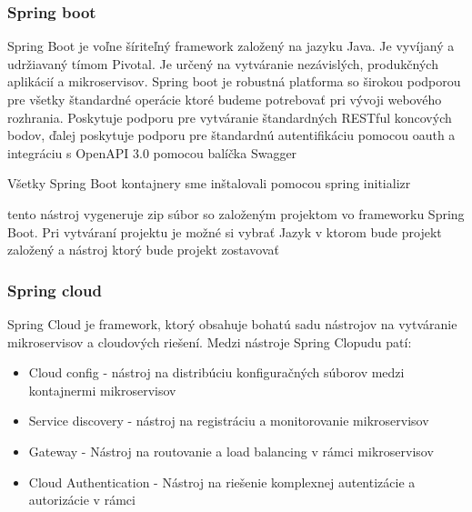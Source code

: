 \subsubsection{Spring boot}  
Spring Boot je voľne šíriteľný framework založený na jazyku Java. Je vyvíjaný a udržiavaný tímom Pivotal. Je určený na vytváranie nezávislých, produkčných aplikácií a mikroservisov. Spring boot je robustná platforma so širokou podporou pre všetky štandardné operácie ktoré budeme potrebovať pri vývoji webového rozhrania. Poskytuje podporu pre vytváranie štandardných RESTful koncových bodov, ďalej poskytuje podporu pre štandardnú autentifikáciu pomocou \acrshort{oauth} a integráciu s  OpenAPI 3.0 \cite{openapi3} pomocou balíčka Swagger \cite{swagger} 







Všetky Spring Boot kontajnery sme inštalovali pomocou spring initializr \cite{initializr} 

tento nástroj vygeneruje zip súbor so založeným projektom vo frameworku Spring Boot. Pri vytváraní projektu je možné si vybrať Jazyk v ktorom bude projekt založený a nástroj ktorý bude projekt zostavovať %

\subsubsection{Spring cloud}  

Spring Cloud je framework, ktorý obsahuje bohatú sadu nástrojov na vytváranie mikroservisov a cloudových riešení. Medzi nástroje Spring Clopudu patí:   


\begin{itemize}  
	\item Cloud config - nástroj na distribúciu konfiguračných súborov medzi kontajnermi mikroservisov 
	\item Service discovery - nástroj na registráciu a monitorovanie mikroservisov  
	\item Gateway - Nástroj na routovanie a load balancing v rámci mikroservisov  	
	\item Cloud Authentication - Nástroj na riešenie komplexnej autentizácie a autorizácie v rámci  

\end{itemize}  



